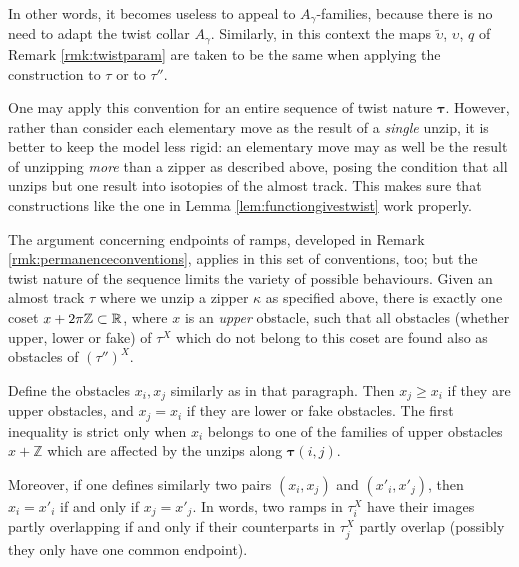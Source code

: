 \begin{rmk}
In other words, it becomes useless to appeal to $A_\gamma$-families, because there is no need to adapt the twist collar $A_\gamma$. Similarly, in this context the maps $\tilde\upsilon$, $\upsilon$, $q$ of Remark \ref{rmk:twistparam} are taken to be the same when applying the construction to $\tau$ or to $\tau''$. 

One may apply this convention for an entire sequence of twist nature $\bm\tau$. However, rather than consider each elementary move as the result of a \emph{single} unzip, it is better to keep the model less rigid: an elementary move may as well be the result of unzipping \emph{more} than a zipper as described above, posing the condition that all unzips but one result into isotopies of the almost track. This makes sure that constructions like the one in Lemma \ref{lem:functiongivestwist} work properly.

The argument concerning endpoints of ramps, developed in Remark \ref{rmk:permanenceconventions}, applies in this set of conventions, too; but the twist nature of the sequence limits the variety of possible behaviours. Given an almost track $\tau$ where we unzip a zipper $\kappa$ as specified above, there is exactly one coset $x+2\pi\mathbb Z\subset \mathbb R$, where $x$ is an \emph{upper} obstacle, such that all obstacles (whether upper, lower or fake) of $\tau^X$ which do not belong to this coset are found also as obstacles of $(\tau'')^X$.

Define the obstacles $x_i,x_j$ similarly as in that paragraph. Then $x_j\geq x_i$ if they are upper obstacles, and $x_j=x_i$ if they are lower or fake obstacles. The first inequality is strict only when $x_i$ belongs to one of the families of upper obstacles $x+\mathbb Z$ which are affected by the unzips along $\bm\tau(i,j)$.

Moreover, if one defines similarly two pairs $(x_i,x_j)$ and $(x'_i,x'_j)$, then $x_i=x'_i$ if and only if $x_j=x'_j$. In words, two ramps in $\tau_i^X$ have their images partly overlapping if and only if their counterparts in $\tau_j^X$ partly overlap (possibly they only have one common endpoint).


\end{rmk}
